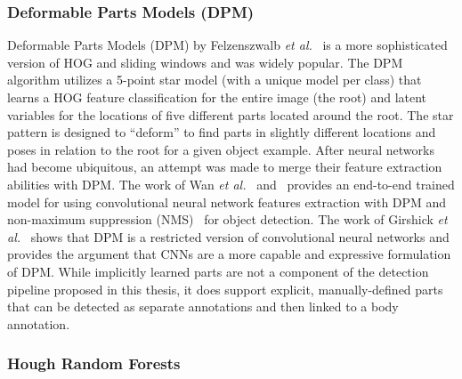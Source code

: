 \subsubsection{Deformable Parts Models (DPM)}

Deformable Parts Models (DPM) by Felzenszwalb \textit{et al.}~\cite{felzenszwalb_discriminatively_2008} is a more sophisticated version of HOG and sliding windows and was widely popular.  The DPM algorithm utilizes a 5-point star model (with a unique model per class) that learns a HOG feature classification for the entire image (the root) and latent variables for the locations of five different parts located around the root.  The star pattern is designed to ``deform'' to find parts in slightly different locations and poses in relation to the root for a given object example.  After neural networks had become ubiquitous, an attempt was made to merge their feature extraction abilities with DPM.  The work of Wan \textit{et al.}~\cite{wan_end--end_2014} and~\cite{ouyang_deepid-net:_2014} provides an end-to-end trained model for using convolutional neural network features extraction with DPM and non-maximum suppression (NMS)~\cite{hosang_what_2015,bodla_soft-nmsimproving_2017,hosang_learning_2017} for object detection.  The work of Girshick \textit{et al.}~\cite{girshick_deformable_2015} shows that DPM is a restricted version of convolutional neural networks and provides the argument that CNNs are a more capable and expressive formulation of DPM.  While implicitly learned parts are not a component of the detection pipeline proposed in this thesis, it does support explicit, manually-defined parts that can be detected as separate annotations and then linked to a body annotation.

\subsubsection{Hough Random Forests}

